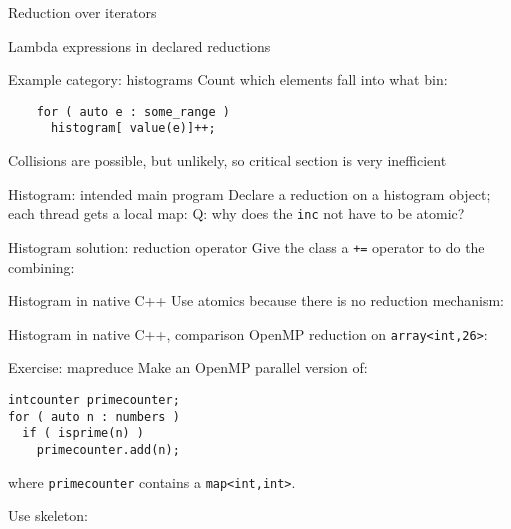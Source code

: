 \documentclass[10pt]{beamer}
\begin{document}
\begin{numberedframe}{Reduction over iterators}
  
\end{numberedframe}

\begin{numberedframe}{Lambda expressions in declared reductions}
  
\end{numberedframe}


\begin{numberedframe}{Example category: histograms}
  Count which elements fall into what bin:
  \begin{lstlisting}
    for ( auto e : some_range )
      histogram[ value(e)]++;
  \end{lstlisting}
  Collisions are possible, but unlikely, so critical section is very inefficient
\end{numberedframe}

\begin{numberedframe}{Histogram: intended main program}
  Declare a reduction on a histogram object;\\
  each thread gets a local map:
  Q: why does the \lstinline{inc} not have to be atomic?
\end{numberedframe}

\begin{numberedframe}{Histogram solution: reduction operator}
  Give the class a \lstinline{+=} operator to do the combining:
  \footnotesize
\end{numberedframe}

\begin{numberedframe}{Histogram in native C++}
  Use atomics because there is no reduction mechanism:
\end{numberedframe}

\begin{numberedframe}{Histogram in native C++, comparison}
  OpenMP reduction on \lstinline{array<int,26>}:
  \footnotesize
  
\end{numberedframe}

\begin{numberedframe}{Exercise: mapreduce}
  Make an OpenMP parallel version of:
\begin{lstlisting}
intcounter primecounter;
for ( auto n : numbers )
  if ( isprime(n) )
    primecounter.add(n);
\end{lstlisting}
  where \lstinline{primecounter} contains a \lstinline|map<int,int>|.

  Use skeleton:   
\end{numberedframe}
\end{document}
